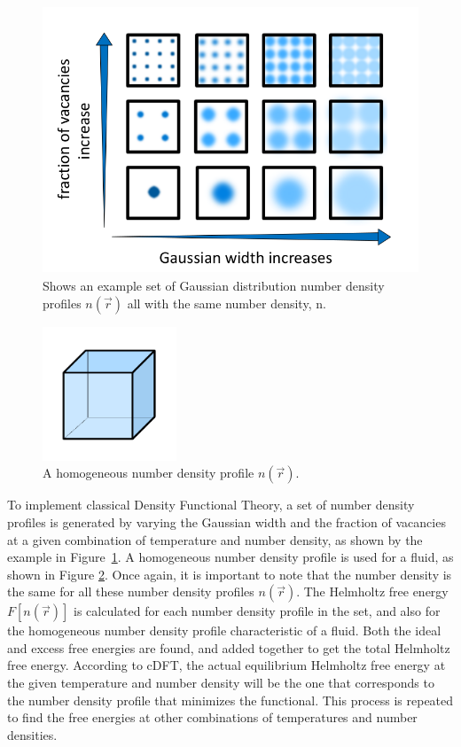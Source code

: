 \documentclass[double,12pt]{beavtex}
\begin{document}
\begin{figure}
   \centering
   \includegraphics[height=8cm]{VaryWidthandVacancies.png}
   \caption{Shows an example set of Gaussian distribution number density 
   profiles $n(\vec r)$ all with the same number density, n.}
   \label{fig:Ensemble_vary}
\end{figure}  
  
\begin{figure}
   \centering
   \includegraphics[height=4cm]{figs/homogeneous_bold-box.pdf}
   \caption{A homogeneous number density profile $n(\vec{r})$.}
   \label{fig:homogen_denisty}
\end{figure} 

To implement classical Density Functional Theory, 
a set of number density profiles is generated by varying the Gaussian width 
and the fraction of vacancies at a given combination of temperature and 
number density, as shown by the example in Figure~\ref{fig:Ensemble_vary}.
A homogeneous number density profile is used for a fluid, as shown in 
Figure \ref{fig:homogen_denisty}.
Once again, it is important to note that the number density is the same 
for all these number density profiles $n(\vec{r})$.  
The Helmholtz free energy $F[n(\vec{r})]$ is calculated for each number 
density profile in the set, and also for the homogeneous number density profile 
characteristic of a fluid. Both the ideal and excess free energies are 
found, and added together to get the total Helmholtz free energy.
According to cDFT, the actual equilibrium Helmholtz free energy at
the given temperature and number density will be the one
that corresponds to the number density profile that minimizes the functional. 
This process is repeated to find the free energies at other combinations 
of temperatures and number densities. 
\end{document}
